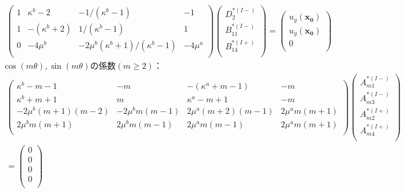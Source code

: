 \begin{align}
	\left(
	\begin{array}{cccc}
		1& \kappa^b-2 & -1/(\kappa^b-1) & -1 \\
		1 & -(\kappa^b+2) & 1/(\kappa^b-1) & 1 \\
		0 & -4\mu^{b} & -2\mu^{b}(\kappa^b+1)/(\kappa^b-1) & -4\mu^{a} \\
	\end{array}
	\right)
	\left(
	\begin{array}{c}
		D_{2}^{*(I-)} \\
	 	B_{11}^{*(I-)} \\
	 	B_{14}^{*(I+)} \\
	\end{array}
	\right)
	=
	\left(
	\begin{array}{c}
		u_{y}(\bm{x_{0}}) \\
	 	u_{y}(\bm{x_{0}}) \\
	 	0 \\
	\end{array}
	\right)
\end{align}
\newpage
$\cos(m\theta),\sin(m\theta)$の係数$(m\geq2)$：
\begin{align}
	\left(
	\begin{array}{cccc}
		\kappa^b-m-1& -m & -(\kappa^a+m-1) & -m \\
		\kappa^b+m+1 & m & \kappa^a-m+1 & -m \\
		-2\mu^{b}(m+1)(m-2) & -2\mu^{b}m(m-1) &
		2\mu^{a}(m+2)(m-1) & 2\mu^{a}m(m+1) \\
		2\mu^{b}m(m+1) & 2\mu^{b}m(m-1) &
		2\mu^{a}m(m-1) & 2\mu^{a}m(m+1) \\
	\end{array}
	\right)
	\left(
	\begin{array}{c}
		A_{m1}^{*(I-)} \\
	 	A_{m3}^{*(I-)} \\
		A_{m2}^{*(I+)}\\
	 	A_{m4}^{*(I+)} \\
	\end{array}
	\right)
	\nonumber
	\\
	=
	\left(
	\begin{array}{c}
		0 \\
	 	0 \\
		0 \\
	 	0 \\
	\end{array}
	\right)
\end{align}
